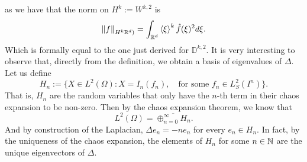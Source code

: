 \documentclass[
    a4paper,
    DIV=14,
    abstract=true,
    numbers=noenddot
]{scrartcl}
\begin{document}
	as we have that the norm on  $H^k:=W^{k,2}$ is
	\begin{equation*}
		\left\lVert f \right\rVert_{H^k\mathbb{R}^d)}=\int_{\mathbb{R}^d}\left\langle\xi \right\rangle^k \hat{f}(\xi )^2d\xi .
	\end{equation*}
	Which is formally equal to the one just derived for $\mathbb{D}^{k,2}.$ It is very interesting to observe that, directly from the definition, we obtain a basis of eigenvalues of $\Delta $. Let us define
	\begin{equation*}
		H_n:=\{X\in L^2(\Omega): X=I_n(f_n),\quad \text{for some } f_n \in L^2_S(I^n)  \} .
	\end{equation*}
	That is, $H_n$ are the random variables that only have the  $n$-th term in their chaos expansion to be non-zero. Then by the chaos expansion theorem, we know that
	\begin{equation*}
		L^2(\Omega)=\overline{\oplus_{n=0}^\infty H_n}.
	\end{equation*}
	And by construction of the Laplacian, $\Delta e_n=-n e_n$ for every $e_n \in H_n$. In fact, by the uniqueness of the chaos expansion, the elements of $H_n$ for some  $n \in \mathbb{N}$ are the unique eigenvectors of $\Delta .$
\end{document}
